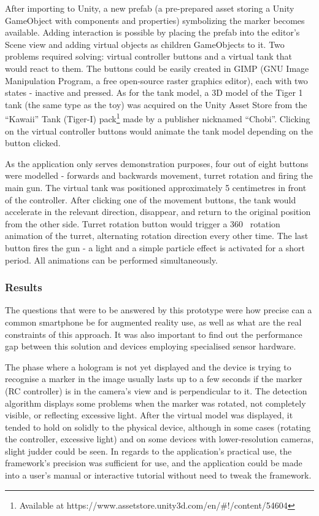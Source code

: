\documentclass[12pt, a4paper]{article}
\begin{document}
After importing to Unity, a new prefab (a pre-prepared asset storing a Unity GameObject with components and properties) symbolizing the marker becomes available. Adding interaction is possible by placing the prefab into the editor’s Scene view and adding virtual objects as children GameObjects to it. Two problems required solving: virtual controller buttons and a virtual tank that would react to them. The buttons could be easily created in GIMP (GNU Image Manipulation Program, a free open-source raster graphics editor), each with two states - inactive and pressed. As for the tank model, a 3D model of the Tiger 1 tank (the same type as the toy) was acquired on the Unity Asset Store from the “Kawaii” Tank (Tiger-I) pack\footnote{Available at https://www.assetstore.unity3d.com/en/\#!/content/54604} made by a publisher nicknamed “Chobi”. Clicking on the virtual controller buttons would animate the tank model depending on the button clicked.

As the application only serves demonstration purposes, four out of eight buttons were modelled - forwards and backwards movement, turret rotation and firing the main gun. The virtual tank was positioned approximately 5 centimetres in front of the controller. After clicking one of the movement buttons, the tank would accelerate in the relevant direction, disappear, and return to the original position from the other side. Turret rotation button would trigger a 360\degree~ rotation animation of the turret, alternating rotation direction every other time. The last button fires the gun - a light and a simple particle effect is activated for a short period. All animations can be performed simultaneously.

\subsubsection{Results}
The questions that were to be answered by this prototype were how precise can a common smartphone be for augmented reality use, as well as what are the real constraints of this approach. It was also important to find out the performance gap between this solution and devices employing specialised sensor hardware.

The phase where a hologram is not yet displayed and the device is trying to recognise a marker in the image usually lasts up to a few seconds if the marker (RC controller) is in the camera’s view and is perpendicular to it. The detection algorithm displays some problems when the marker was rotated, not completely visible, or reflecting excessive light. After the virtual model was displayed, it tended to hold on solidly to the physical device, although in some cases (rotating the controller, excessive light) and on some devices with lower-resolution cameras, slight judder could be seen. In regards to the application’s practical use, the framework’s precision was sufficient for use, and the application could be made into a user’s manual or interactive tutorial without need to tweak the framework.
\end{document}
